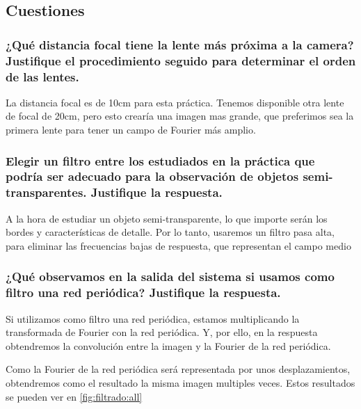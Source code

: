\documentclass{./packages/optica-article}
\begin{document}
\subsection{Cuestiones}
\subsubsection{¿Qué distancia focal tiene la lente más próxima a la camera? Justifique el procedimiento seguido para determinar el orden de las lentes.}
La distancia focal es de 10cm para esta práctica. Tenemos disponible otra lente de focal de 20cm, pero esto crearía una imagen mas grande, que preferimos sea la primera lente para tener un campo de Fourier más amplio.

\subsubsection{Elegir un filtro entre los estudiados en la práctica que podría ser adecuado para la observación de objetos semi-transparentes. Justifique la respuesta.}

A la hora de estudiar un objeto semi-transparente, lo que importe serán los bordes y características de detalle. Por lo tanto, usaremos un filtro pasa alta, para eliminar las frecuencias bajas de respuesta, que representan el campo medio

\subsubsection{¿Qué observamos en la salida del sistema si usamos como filtro una red periódica? Justifique la respuesta.}
Si utilizamos como filtro una red periódica, estamos multiplicando la transformada de Fourier con la red periódica. Y, por ello, en la respuesta obtendremos la convolución entre la imagen y la Fourier de la red periódica.

Como la Fourier de la red periódica será representada por unos desplazamientos, obtendremos como el resultado la misma imagen multiples veces. Estos resultados se pueden ver en \ref{fig:filtrado:all}
\end{document}
